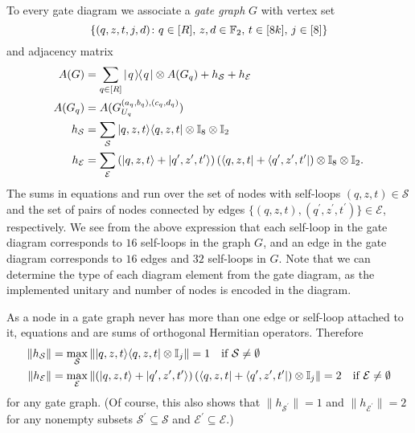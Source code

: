 \documentclass[../thesis-main/thesis-main]{subfiles}
\begin{document}
To every gate diagram we associate a \emph{gate graph} $G$ with
vertex set 
\begin{equation}
\left\{ (q,z,t,j,d)\colon q\in[R],\, z,d\in\mathbb{F}_2,\, t\in[8k],\, j\in [8]\right\} 
\end{equation}
and adjacency matrix 
\begin{align}
A(G) & =\sum_{q\in [R]} |\mspace{2mu} q \mspace{2mu} \rangle\mspace{-2mu}\langle\mspace{2mu} q \mspace{2mu} |\otimes A(G_q)+h_{\mathcal{S}}+h_{\mathcal{E}}\label{eq:adj_gate_graph}\\
A(G_q) &= A(G_{U_q}^{(a_q,b_q),(c_q,d_q)})\\
h_{\mathcal{S}} & =\sum_{\mathcal{S}}|q,z,t\rangle\langle q,z,t|\otimes\mathbb{I}_{8} \otimes \mathbb{I}_2\label{eq:h_loops}\\
h_{\mathcal{E}} & =\sum_{\mathcal{E}}\left(|q,z,t\rangle+|q^{\prime},z^{\prime},t^{\prime}\rangle\right)\left(\langle q,z,t|+\langle q^{\prime},z^{\prime},t^{\prime}|\right)\otimes\mathbb{I}_{8}\otimes \mathbb{I}_2.\label{eq:h_edges}
\end{align}
The sums in equations  and  run over the set of nodes with self-loops $(q,z,t)\in\mathcal{S}$ and the set of pairs of nodes connected by edges $\{(q,z,t),(q^{\prime},z^{\prime},t^{\prime})\}\in\mathcal{E}$, respectively. We see from the above expression that each self-loop in the gate diagram corresponds to $16$ self-loops in the graph $G$, and an edge in the gate diagram corresponds to $16$ edges and $32$ self-loops in $G$.  Note that we can determine the type of each diagram element from the gate diagram, as the implemented unitary and number of nodes is encoded in the diagram.

As a node in a gate graph never has more than one edge or self-loop attached to it, equations  and  are sums of orthogonal Hermitian operators.  Therefore 
\begin{align}
\left\Vert h_{\mathcal{S}}\right\Vert  & =\max_{\mathcal{S}}\left\Vert |q,z,t\rangle\langle q,z,t|\otimes\mathbb{I}_{j}\right\Vert =1\quad\text{if }\mathcal{S}\neq\emptyset\label{eq:h_S_bound}\\
\left\Vert h_{\mathcal{E}}\right\Vert  & =\max_{\mathcal{E}}\left\Vert \left(|q,z,t\rangle+|q^{\prime},z^{\prime},t^{\prime}\rangle\right)\left(\langle q,z,t|+\langle q^{\prime},z^{\prime},t^{\prime}|\right)\otimes\mathbb{I}_{j}\right\Vert =2\quad\text{if }\mathcal{E}\neq\emptyset\label{eq:h_E_bound}
\end{align}
for any gate graph. (Of course, this also shows that $\|{h_{\mathcal{S}^\prime}}\|=1$ and $\|{h_{\mathcal{E}^\prime}}\|=2$ for any nonempty subsets $\mathcal{S}^\prime\subseteq \mathcal{S}$ and $\mathcal{E}^\prime\subseteq \mathcal{E}$.)
\end{document}
